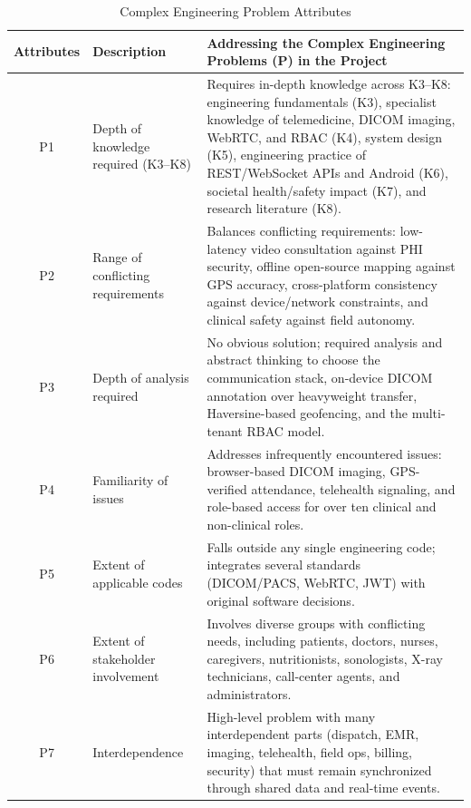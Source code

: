 \documentclass[lettersize,onecolumn,journal]{IEEEtran}
\begin{document}
\begin{table}[H]
\centering
\caption{Complex Engineering Problem Attributes}
\begin{tabular}{|c|>{\raggedright\arraybackslash}m{4cm}|>{\raggedright\arraybackslash}m{8cm}|}
\hline
\textbf{Attributes} & \textbf{Description} & \textbf{Addressing the Complex Engineering Problems (P) in the Project} \\
\hline
P1 & Depth of knowledge required (K3--K8) & Requires in-depth knowledge across K3--K8: engineering fundamentals (K3), specialist knowledge of telemedicine, DICOM imaging, WebRTC, and RBAC (K4), system design (K5), engineering practice of REST/WebSocket APIs and Android (K6), societal health/safety impact (K7), and research literature (K8). \\
\hline
P2 & Range of conflicting requirements & Balances conflicting requirements: low-latency video consultation against PHI security, offline open-source mapping against GPS accuracy, cross-platform consistency against device/network constraints, and clinical safety against field autonomy. \\
\hline
P3 & Depth of analysis required & No obvious solution; required analysis and abstract thinking to choose the communication stack, on-device DICOM annotation over heavyweight transfer, Haversine-based geofencing, and the multi-tenant RBAC model. \\
\hline
P4 & Familiarity of issues & Addresses infrequently encountered issues: browser-based DICOM imaging, GPS-verified attendance, telehealth signaling, and role-based access for over ten clinical and non-clinical roles. \\
\hline
P5 & Extent of applicable codes & Falls outside any single engineering code; integrates several standards (DICOM/PACS, WebRTC, JWT) with original software decisions. \\
\hline
P6 & Extent of stakeholder involvement & Involves diverse groups with conflicting needs, including patients, doctors, nurses, caregivers, nutritionists, sonologists, X-ray technicians, call-center agents, and administrators. \\
\hline
P7 & Interdependence & High-level problem with many interdependent parts (dispatch, EMR, imaging, telehealth, field ops, billing, security) that must remain synchronized through shared data and real-time events. \\
\hline
\end{tabular}
\label{tab:cep}
\end{table}
\end{document}
